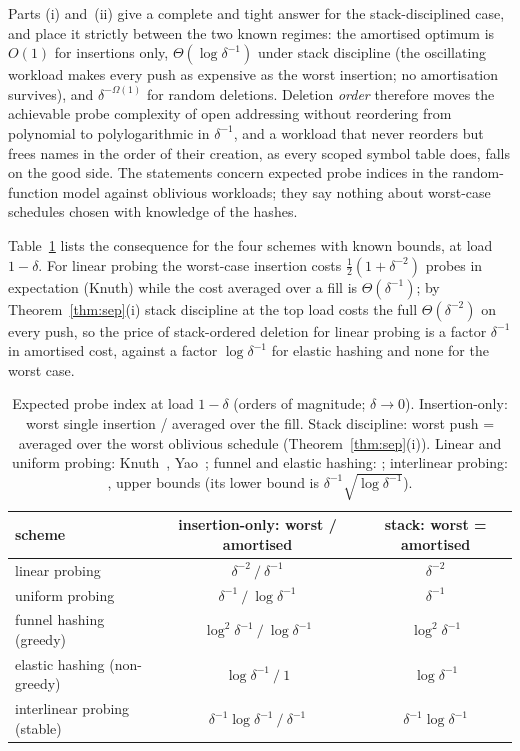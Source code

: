 \documentclass[11pt,a4paper]{article}
\theoremstyle{definition}
\theoremstyle{remark}
\begin{document}
Parts (i) and~(ii) give a complete and tight answer for the stack-disciplined case, and place it strictly between the two known regimes: the amortised optimum is $O(1)$ for insertions only, $\Theta(\log\delta^{-1})$ under stack discipline (the oscillating workload makes every push as expensive as the worst insertion; no amortisation survives), and $\delta^{-\Omega(1)}$ for random deletions. Deletion \emph{order} therefore moves the achievable probe complexity of open addressing without reordering from polynomial to polylogarithmic in $\delta^{-1}$, and a workload that never reorders but frees names in the order of their creation, as every scoped symbol table does, falls on the good side. The statements concern expected probe indices in the random-function model against oblivious workloads; they say nothing about worst-case schedules chosen with knowledge of the hashes.

Table~\ref{tab:hier} lists the consequence for the four schemes with known bounds, at load $1-\delta$. For linear probing the worst-case insertion costs $\tfrac12(1+\delta^{-2})$ probes in expectation (Knuth) while the cost averaged over a fill is $\Theta(\delta^{-1})$; by Theorem~\ref{thm:sep}(i) stack discipline at the top load costs the full $\Theta(\delta^{-2})$ on every push, so the price of stack-ordered deletion for linear probing is a factor $\delta^{-1}$ in amortised cost, against a factor $\log\delta^{-1}$ for elastic hashing and none for the worst case.

\begin{table}[t]
\centering\small
\caption{Expected probe index at load $1-\delta$ (orders of magnitude; $\delta\to0$). Insertion-only: worst single insertion / averaged over the fill. Stack discipline: worst push = averaged over the worst oblivious schedule (Theorem~\ref{thm:sep}(i)). Linear and uniform probing: Knuth~\cite{knuth3}, Yao~\cite{yao1985}; funnel and elastic hashing: \cite{fkk2024}; interlinear probing: \cite{kkw2026}, upper bounds (its lower bound is $\delta^{-1}\sqrt{\log\delta^{-1}}$).}\label{tab:hier}
\begin{tabular}{@{}lcc@{}}
\toprule
scheme & insertion-only: worst / amortised & stack: worst = amortised \\
\midrule
linear probing & $\delta^{-2}\ /\ \delta^{-1}$ & $\delta^{-2}$ \\
uniform probing & $\delta^{-1}\ /\ \log\delta^{-1}$ & $\delta^{-1}$ \\
funnel hashing (greedy) & $\log^2\delta^{-1}\ /\ \log\delta^{-1}$ & $\log^2\delta^{-1}$ \\
elastic hashing (non-greedy) & $\log\delta^{-1}\ /\ 1$ & $\log\delta^{-1}$ \\
interlinear probing (stable) & $\delta^{-1}\log\delta^{-1}\ /\ \delta^{-1}$ & $\delta^{-1}\log\delta^{-1}$ \\
\bottomrule
\end{tabular}
\end{table}
\end{document}
